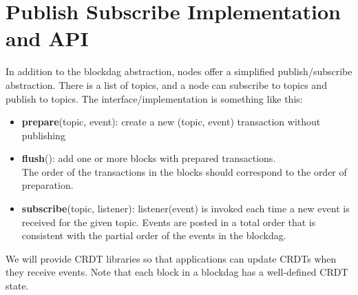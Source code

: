 \section{Publish  Subscribe Implementation and API} \label{pubsub}
In addition to the blockdag abstraction, nodes offer a simplified
publish/subscribe abstraction.  There is a list of topics, and a node can
subscribe to topics and publish to topics. The interface/implementation is
something like this:
\begin{itemize}
    \item{ \textbf{prepare}(topic, event): create a new (topic, event)
     transaction without publishing}
    \item{ \textbf{flush}(): add one or more blocks with prepared transactions.
    \\The order of the transactions in the blocks should correspond to the
     order of preparation.}
    \item{ \textbf{subscribe}(topic, listener):  listener(event) is invoked
     each time a new event is received for the given topic.  Events are posted
     in a total order that is consistent with the partial order of the events
     in the blockdag.}
\end{itemize}
We will provide CRDT libraries so that applications can update CRDTs when they
receive events.  Note that each block in a blockdag has a well-defined CRDT
state.
